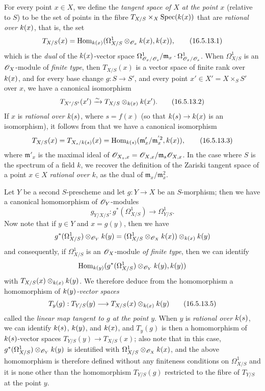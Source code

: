 \begin{env}[16.5.13]
\label{IV.16.5.13}
For every point $x \in X$, we define the \emph{tangent space of $X$ at the point $x$} (relative to $S$) to be the set of points in the fibre $T_{X/S} \times_X \operatorname{Spec}(k(x))$ that are \emph{rational over $k(x)$}, that is, the set
\[
\label{IV.16.5.13.1}
  T_{X/S}(x) = \operatorname{Hom}_{k(x)}(\Omega_{X/S}^1 \otimes_{\mathscr{O}_x} k(x), k(x)),
  \tag{16.5.13.1}
\]
which is the \emph{dual} of the $k(x)$-vector space $\Omega_{\mathscr{O}_x/\mathscr{O}_s}^1/\mathfrak{m}_x \cdot \Omega_{\mathscr{O}_x/\mathscr{O}_s}^1$.
When $\Omega_{X/S}^1$ is an $\mathscr{O}_X$-module of \emph{finite type}, then $T_{X/S}(x)$ is a vector space of finite rank over $k(x)$, and for every base change
$g : S \to S'$, and every point $x' \in X' = X \times_S S'$ over $x$, we have a canonical isomorphism
\[
\label{IV.16.5.13.2}
  T_{X'/S'}(x') \xrightarrow{\sim} T_{X/S} \otimes_{k(x)} k(x').
  \tag{16.5.13.2}
\]
If $x$ is \emph{rational over $k(s)$}, where $s = f(x)$ (so that $\kres(s) \to \kres(x)$ is an isomorphism), it follows from  that we have a canonical isomorphism
\[
\label{IV.16.5.13.3}
  T_{X/S}(x) = T_{X_s/k(s)}(x) = \operatorname{Hom}_{k(s)}(\mathfrak{m}'_x/\mathfrak{m}_x^{'2}, k(x)),
  \tag{16.5.13.3}
\]
where $\mathfrak{m}'_x$ is the maximal ideal of $\mathscr{O}_{X_s,x} = \mathscr{O}_{X, x}/\mathfrak{m}_s \mathscr{O}_{X,x}$.
In the case where $S$ is the spectrum of a field $k$, we recover the definition of the Zariski tangent space of a point $x \in X$ \emph{rational over $k$}, as the dual of $\mathfrak{m}_x / \mathfrak{m}_x^2$.

Let $Y$ be a second $S$-prescheme and let $g : Y \to X$ be an $S$-morphism;
then we have a canonical homomorphism of $\mathscr{O}_Y$-modules 
\[
\label{IV.16.5.13.4}
  g_{Y/X/S} : g^*(\Omega_{X/S}^1) \to \Omega_{Y/S}^1.
  \tag{16.5.13.4}
\]
Now note that if $y \in Y$ and $x = g(y)$, then we have
\[
  g^*(\Omega_{X/S}^1) \otimes_{\mathscr{O}_Y} k(y) = (\Omega_{X/S}^1 \otimes_{\mathscr{O}_X} k(x)) \otimes_{k(x)} k(y) 
\]
and consequently, if $\Omega_{X/S}^1$ is an $\mathscr{O}_X$-module \emph{of finite type}, then we can identify
\[
  \operatorname{Hom}_{k(y)}(g^*(\Omega_{X/S}^1) \otimes_{\mathscr{O}_Y} k(y), k(y))
\]
with $T_{X/S}(x) \otimes_{k(x)} k(y)$.
We therefore deduce from the homomorphism  a homomorphism of \emph{$k(y)$-vector spaces}
\[
\label{IV.16.5.13.5}
  T_y(g) : T_{Y/S}(y) \to T_{X/S}(x) \otimes_{\kres(x)} \kres(y)
  \tag{16.5.13.5}
\]
called the \emph{linear map tangent to $g$ at the point $y$}.
When $y$ is \emph{rational over $k(s)$}, we can identify $k(s)$, $k(y)$, and $k(x)$, and $T_y(g)$ is then a homomorphism of $k(s)$-vector spaces $T_{Y/S}(y) \to T_{X/S}(x)$;
also note that in this case, $g^*(\Omega_{X/S}^1) \otimes_{\mathscr{O}_Y} k(y)$ is identified with $\Omega_{X/S}^1 \otimes_{\mathscr{O}_X} k(x)$, and the above homomorphism is therefore defined without any finiteness conditions on $\Omega_{X/S}^1$ and it is none other than the homomorphism $T_{Y/S}(g)$  restricted to the fibre of $T_{Y/S}$ at the point $y$.
\end{env}

